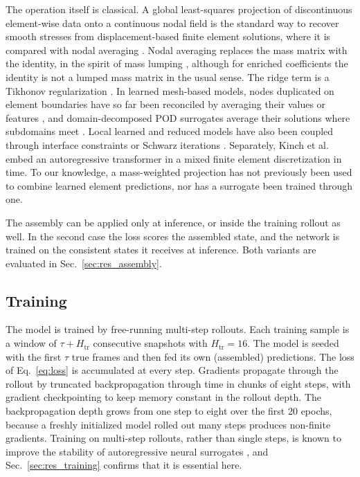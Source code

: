 \documentclass[conf]{new-aiaa}
\begin{document}
The operation itself is classical. A global least-squares projection of discontinuous element-wise data onto a continuous nodal field is the standard way to recover smooth stresses from displacement-based finite element solutions, where it is compared with nodal averaging \cite{oden1971consistent,hinton1974smoothing,zienkiewicz1992spr}. Nodal averaging replaces the mass matrix with the identity, in the spirit of mass lumping \cite{hinton1976lumping,hughes2000fem}, although for enriched coefficients the identity is not a lumped mass matrix in the usual sense. The ridge term is a Tikhonov regularization \cite{tikhonov1977illposed,hoerl1970ridge}. In learned mesh-based models, nodes duplicated on element boundaries have so far been reconciled by averaging their values or features \cite{barwey2024consistent,sankaran2025elementlocal}, and domain-decomposed POD surrogates average their solutions where subdomains meet \cite{pan2024ddpdcnn}. Local learned and reduced models have also been coupled through interface constraints or Schwarz iterations \cite{diaz2024ddnm,heinlein2021ddml}. Separately, Kinch et al.~\cite{kinch2026hybridizable} embed an autoregressive transformer in a mixed finite element discretization in time. To our knowledge, a mass-weighted projection has not previously been used to combine learned element predictions, nor has a surrogate been trained through one.

The assembly can be applied only at inference, or inside the training rollout as well. In the second case the loss scores the assembled state, and the network is trained on the consistent states it receives at inference. Both variants are evaluated in Sec.~\ref{sec:res_assembly}.

\subsection{Training}
The model is trained by free-running multi-step rollouts. Each training sample is a window of $\tau+H_\mathrm{tr}$ consecutive snapshots with $H_\mathrm{tr}=16$. The model is seeded with the first $\tau$ true frames and then fed its own (assembled) predictions. The loss of Eq.~\eqref{eq:loss} is accumulated at every step. Gradients propagate through the rollout by truncated backpropagation through time \cite{werbos1990} in chunks of eight steps, with gradient checkpointing \cite{chen2016checkpoint} to keep memory constant in the rollout depth. The backpropagation depth grows from one step to eight over the first 20 epochs, because a freshly initialized model rolled out many steps produces non-finite gradients. Training on multi-step rollouts, rather than single steps, is known to improve the stability of autoregressive neural surrogates \cite{brandstetter2022mpnn,vlachas2020backprop}, and Sec.~\ref{sec:res_training} confirms that it is essential here.
\end{document}
